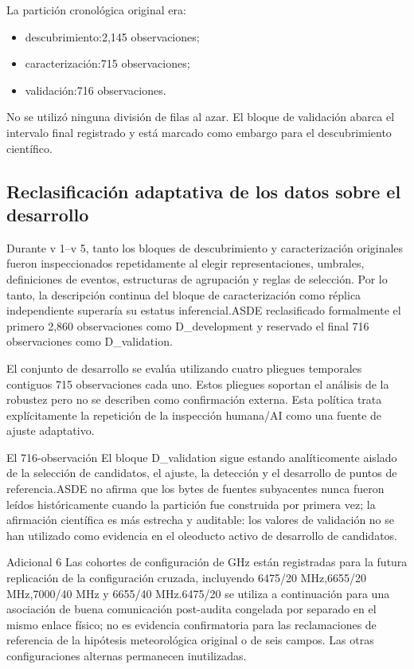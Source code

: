 \documentclass{ieeeaccess}
\providecommand{\tightlist}{\setlength{\itemsep}{0pt}\setlength{\parskip}{0pt}}
\begin{document}
La partición cronológica original era:

\begin{itemize}
\tightlist
\item
  descubrimiento:2,145 observaciones;
\item
  caracterización:715 observaciones;
\item
  validación:716 observaciones.
\end{itemize}

No se utilizó ninguna división de filas al azar. El bloque de validación abarca el intervalo final registrado y está marcado como embargo para el descubrimiento científico.

\subsection{Reclasificación adaptativa de los datos sobre el desarrollo}\label{reclasificaciuxf3n-adaptativa-de-los-datos-sobre-el-desarrollo}

Durante v 1--v 5, tanto los bloques de descubrimiento y caracterización originales fueron inspeccionados repetidamente al elegir representaciones, umbrales, definiciones de eventos, estructuras de agrupación y reglas de selección. Por lo tanto, la descripción continua del bloque de caracterización como réplica independiente superaría su estatus inferencial.ASDE reclasificado formalmente el primero 2,860 observaciones como D\_development y reservado el final 716 observaciones como D\_validation.

El conjunto de desarrollo se evalúa utilizando cuatro pliegues temporales contiguos 715 observaciones cada uno. Estos pliegues soportan el análisis de la robustez pero no se describen como confirmación externa. Esta política trata explícitamente la repetición de la inspección humana/AI como una fuente de ajuste adaptativo.

El 716-observación El bloque D\_validation sigue estando analíticomente aislado de la selección de candidatos, el ajuste, la detección y el desarrollo de puntos de referencia.ASDE no afirma que los bytes de fuentes subyacentes nunca fueron leídos históricamente cuando la partición fue construida por primera vez; la afirmación científica es más estrecha y auditable: los valores de validación no se han utilizado como evidencia en el oleoducto activo de desarrollo de candidatos.

Adicional 6 Las cohortes de configuración de GHz están registradas para la futura replicación de la configuración cruzada, incluyendo 6475/20 MHz,6655/20 MHz,7000/40 MHz y 6655/40 MHz.6475/20 se utiliza a continuación para una asociación de buena comunicación post-audita congelada por separado en el mismo enlace físico; no es evidencia confirmatoria para las reclamaciones de referencia de la hipótesis meteorológica original o de seis campos. Las otras configuraciones alternas permanecen inutilizadas.
\end{document}
